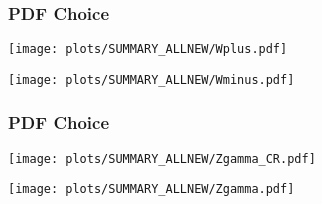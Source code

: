 \begin{frame}
	\frametitle{PDF Choice}
	
	\centering
		\texttt{[image: plots/SUMMARY\_ALLNEW/Wplus.pdf]}	
	
	\centering
			\texttt{[image: plots/SUMMARY\_ALLNEW/Wminus.pdf]}
	\cend
\end{frame}

\begin{frame}
	\frametitle{PDF Choice}
	
	\centering
		\texttt{[image: plots/SUMMARY\_ALLNEW/Zgamma\_CR.pdf]}	
	
	\centering
			\texttt{[image: plots/SUMMARY\_ALLNEW/Zgamma.pdf]}
	\cend
\end{frame}